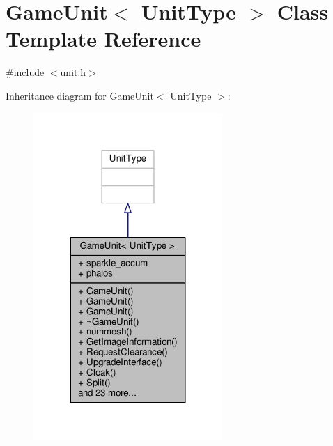 \hypertarget{classGameUnit}{}\section{Game\+Unit$<$ Unit\+Type $>$ Class Template Reference}
\label{classGameUnit}


{\ttfamily \#include $<$unit.\+h$>$}



Inheritance diagram for Game\+Unit$<$ Unit\+Type $>$\+:
\nopagebreak
\begin{figure}[H]
\begin{center}
\leavevmode
\includegraphics[width=203pt]{d0/d33/classGameUnit__inherit__graph}
\end{center}
\end{figure}



